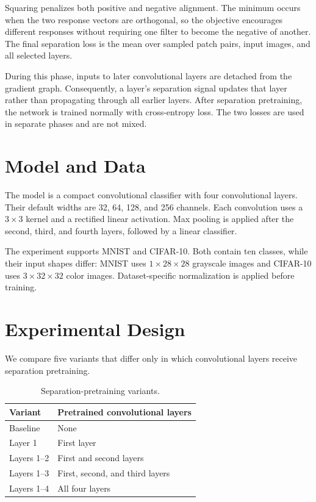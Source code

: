 \documentclass[11pt]{article}
\begin{document}
Squaring penalizes both positive and negative alignment.  The minimum occurs
when the two response vectors are orthogonal, so the objective encourages
different responses without requiring one filter to become the negative of
another. The final separation loss is the mean over sampled patch pairs, input
images, and all selected layers.

During this phase, inputs to later convolutional layers are detached from the
gradient graph.  Consequently, a layer's separation signal updates that layer
rather than propagating through all earlier layers.  After separation
pretraining, the network is trained normally with cross-entropy loss.  The two
losses are used in separate phases and are not mixed.

\section{Model and Data}

The model is a compact convolutional classifier with four convolutional layers.
Their default widths are 32, 64, 128, and 256 channels. Each convolution uses a
$3\times3$ kernel and a rectified linear activation. Max pooling is applied
after the second, third, and fourth layers, followed by a linear classifier.

The experiment supports MNIST and CIFAR-10.  Both contain ten classes, while
their input shapes differ: MNIST uses $1\times28\times28$ grayscale images and
CIFAR-10 uses $3\times32\times32$ color images.  Dataset-specific normalization
is applied before training.

\section{Experimental Design}

We compare five variants that differ only in which convolutional layers receive
separation pretraining.

\begin{table}[h]
    \centering
    \begin{tabular}{ll}
        \toprule
        Variant & Pretrained convolutional layers \\
        \midrule
        Baseline & None \\
        Layer 1 & First layer \\
        Layers 1--2 & First and second layers \\
        Layers 1--3 & First, second, and third layers \\
        Layers 1--4 & All four layers \\
        \bottomrule
    \end{tabular}
    \caption{Separation-pretraining variants.}
\end{table}
\end{document}
